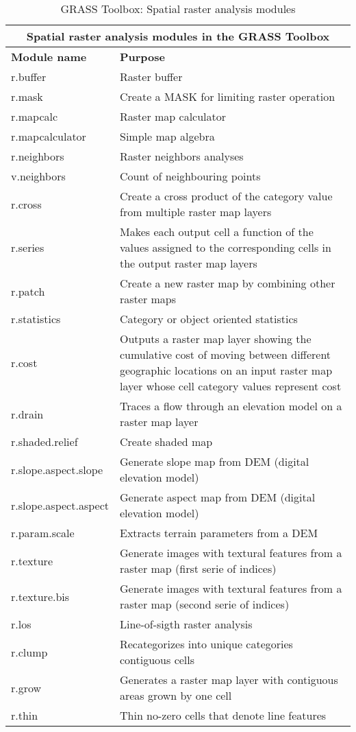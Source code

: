 \begin{table}[ht]
\centering
\caption{GRASS Toolbox: Spatial raster analysis modules}\medskip
 \begin{tabular}{|p{4cm}|p{12cm}|}
  \hline \multicolumn{2}{|c|}{\textbf{Spatial raster analysis modules in the
  GRASS Toolbox}} \\
  \hline \textbf{Module name} & \textbf{Purpose} \\
  \hline r.buffer & Raster buffer \\
  \hline r.mask & Create a MASK for limiting raster operation \\
  \hline r.mapcalc & Raster map calculator \\
  \hline r.mapcalculator & Simple map algebra \\
  \hline r.neighbors & Raster neighbors analyses \\
  \hline v.neighbors & Count of neighbouring points \\
  \hline r.cross & Create a cross product of the category value from multiple
  raster map layers \\
  \hline r.series & Makes each output cell a function of the values assigned
  to the corresponding cells in the output raster map layers\\
  \hline r.patch & Create a new raster map by combining other raster maps \\
  \hline r.statistics & Category or object oriented statistics \\
  \hline r.cost & Outputs a raster map layer showing the cumulative cost of
  moving between different geographic locations on an input raster map layer
  whose cell category values represent cost\\
  \hline r.drain & Traces a flow through an elevation model on a raster map
  layer \\
  \hline r.shaded.relief & Create shaded map \\
  \hline r.slope.aspect.slope & Generate slope map from DEM (digital
  elevation model) \\
  \hline r.slope.aspect.aspect & Generate aspect map from DEM (digital
  elevation model) \\
  \hline r.param.scale & Extracts terrain parameters from a DEM \\
  \hline r.texture & Generate images with textural features from a raster map
  (first serie of indices)\\
  \hline r.texture.bis & Generate images with textural features from a raster
  map (second serie of indices)\\
  \hline r.los & Line-of-sigth raster analysis \\
  \hline r.clump & Recategorizes into unique categories contiguous cells \\
  \hline r.grow & Generates a raster map layer with contiguous areas grown by
  one cell\\
  \hline r.thin & Thin no-zero cells that denote line features \\
\hline
\end{tabular}
\end{table}

